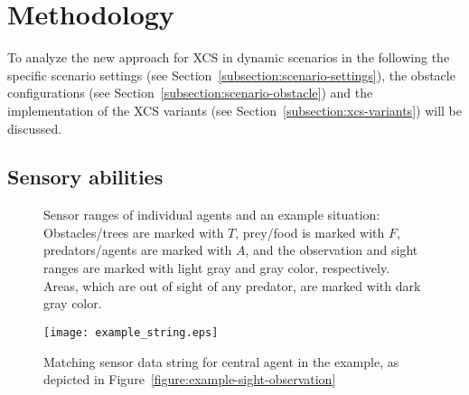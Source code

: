 \section{Methodology}
\label{section:methodology}
To analyze the new approach for XCS in dynamic scenarios in the following the specific scenario settings (see Section~\ref{subsection:scenario-settings}), the obstacle configurations (see Section~\ref{subsection:scenario-obstacle}) and the implementation of the XCS variants (see Section~\ref{subsection:xcs-variants}) will be discussed.



\subsection{Sensory abilities}

\begin{figure}[ht]
	\hfill
  \hfill
  \subfigure[Example situation]{ %
  	\label{figure:example-sight-observation}
  	\texttt{[image: example\_sight\_observation.eps]}}
  \caption{Sensor ranges of individual agents and an example situation: Obstacles/trees are marked with $T$, prey/food is marked with $F$, predators/agents are marked with $A$, and the observation and sight ranges are marked with light gray and gray color, respectively. Areas, which are out of sight of any predator, are marked with dark gray color.}
  \label{figure:sight-directions}
\end{figure}

\begin{figure}[ht]
	\centerline{
		\texttt{[image: example\_string.eps]}
	}
	\caption{Matching sensor data string for central agent in the example, as depicted in Figure~\ref{figure:example-sight-observation}}
	\label{figure:example-string}
\end{figure}

